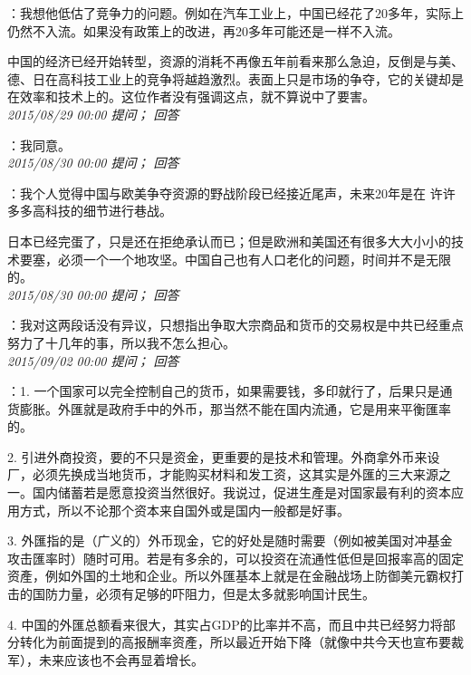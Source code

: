 \documentclass[twocolumn]{ctexart}
\begin{document}
：我想他低估了竞争力的问题。例如在汽车工业上，中国已经花了20多年，实际上仍然不入流。如果没有政策上的改进，再20多年可能还是一样不入流。

中国的经济已经开始转型，资源的消耗不再像五年前看来那么急迫，反倒是与美、德、日在高科技工业上的竞争将越趋激烈。表面上只是市场的争夺，它的关键却是在效率和技术上的。这位作者没有强调这点，就不算说中了要害。\\

\textit{\hfill\noindent\small 2015/08/29 00:00 提问； 回答}

：我同意。\\

\textit{\hfill\noindent\small 2015/08/30 00:00 提问； 回答}

：我个人觉得中国与欧美争夺资源的野战阶段已经接近尾声，未来20年是在 许许多多高科技的细节进行巷战。

日本已经完蛋了，只是还在拒绝承认而已；但是欧洲和美国还有很多大大小小的技术要塞，必须一个一个地攻坚。中国自己也有人口老化的问题，时间并不是无限的。\\

\textit{\hfill\noindent\small 2015/08/30 00:00 提问； 回答}

：我对这两段话没有异议，只想指出争取大宗商品和货币的交易权是中共已经重点努力了十几年的事，所以我不怎么担心。\\

\textit{\hfill\noindent\small 2015/09/02 00:00 提问； 回答}

：1. 一个国家可以完全控制自己的货币，如果需要钱，多印就行了，后果只是通货膨胀。外匯就是政府手中的外币，那当然不能在国内流通，它是用来平衡匯率的。

2. 引进外商投资，要的不只是资金，更重要的是技术和管理。外商拿外币来设厂，必须先换成当地货币，才能购买材料和发工资，这其实是外匯的三大来源之一。国内储蓄若是愿意投资当然很好。我说过，促进生產是对国家最有利的资本应用方式，所以不论那个资本来自国外或是国内一般都是好事。

3. 外匯指的是（广义的）外币现金，它的好处是随时需要（例如被美国对冲基金攻击匯率时）随时可用。若是有多余的，可以投资在流通性低但是回报率高的固定资產，例如外国的土地和企业。所以外匯基本上就是在金融战场上防御美元霸权打击的国防力量，必须有足够的吓阻力，但是太多就影响国计民生。

4. 中国的外匯总额看来很大，其实占GDP的比率并不高，而且中共已经努力将部分转化为前面提到的高报酬率资產，所以最近开始下降（就像中共今天也宣布要裁军），未来应该也不会再显着增长。
\end{document}
